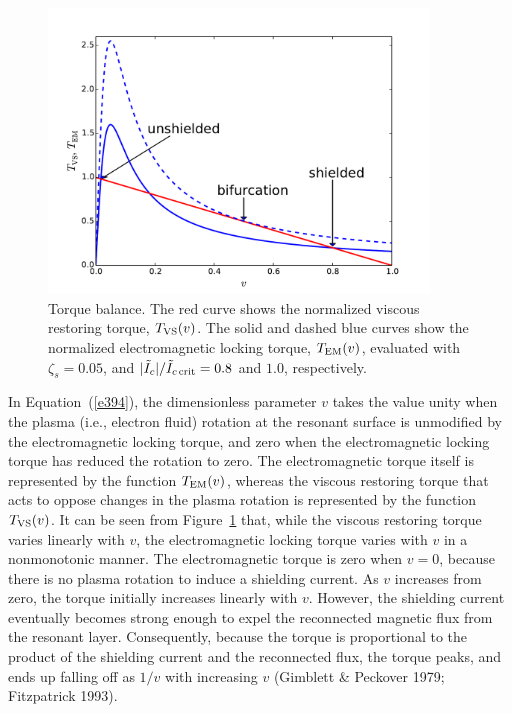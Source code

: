 \documentclass[notitlepage,12pt]{article}
\begin{document}
\begin{figure}[t]
\centerline{\includegraphics[width=0.9\textwidth]{Torque.pdf}}
\caption{Torque balance. The red curve shows the normalized viscous restoring torque, $T_{\rm VS}(v)$. The
solid and dashed blue curves show the normalized electromagnetic locking torque, $T_{\rm EM}(v)$,
evaluated with $\zeta_s=0.05$, and
 $|\tilde{I}_c|/\tilde{I}_{c\,{\rm crit}}=0.8$ and $1.0$, respectively. }\label{f5}
\end{figure}

In Equation~(\ref{e394}), the dimensionless
parameter $v$ takes the value unity when the plasma (i.e., electron fluid) rotation at the resonant surface is unmodified by
the electromagnetic locking torque, and zero when the electromagnetic locking torque has reduced the rotation to zero. The electromagnetic torque itself
is represented  by the function $T_{\rm EM}(v)$, whereas the viscous restoring torque that acts to oppose changes in the plasma rotation is represented
by the function $T_{\rm VS}(v)$. It can be seen from Figure~\ref{f5} that, while the viscous restoring torque varies linearly with $v$,
the electromagnetic locking torque varies with $v$ in a nonmonotonic manner. The electromagnetic torque is
zero when $v=0$, because there is no plasma rotation to induce a shielding current. As $v$ increases from zero, the
torque initially increases linearly with $v$. However, the shielding current eventually becomes strong enough to expel
the reconnected magnetic flux from the resonant layer. Consequently, because the torque
is proportional to the product of the shielding current and the reconnected flux, the torque peaks, and ends up falling off as $1/v$ 
with increasing $v$ (Gimblett \& Peckover 1979; Fitzpatrick 1993). 
\end{document}
